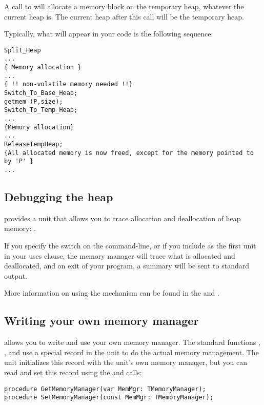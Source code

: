 A call to  will allocate a memory block on the temporary
heap, whatever the current heap is. The current heap after this call will be
the temporary heap.

Typically, what will appear in your code is the following sequence:
\begin{verbatim}
Split_Heap
...
{ Memory allocation }
...
{ !! non-volatile memory needed !!}
Switch_To_Base_Heap;
getmem (P,size);
Switch_To_Temp_Heap;
...
{Memory allocation}
...
ReleaseTempHeap;
{All allocated memory is now freed, except for the memory pointed to by 'P' }
...
\end{verbatim}
\subsection{Debugging the heap}

\fpc provides a unit that allows you to trace allocation and deallocation
of heap memory: .

If you specify the  switch on the command-line, or if you include
 as the first unit in your uses clause, the memory manager
will trace what is allocated and deallocated, and on exit of your program,
a summary will be sent to standard output.

More information on using the  mechanism can be found in the
\userref and \unitsref.

\subsection{Writing your own memory manager}

\fpc allows you to write and use your own memory manager. The standard
functions , ,  and 
use a special record in the  unit to do the actual memory management.
The  unit initializes this record with the  unit's own memory
manager, but you can read and set this record using the
 and  calls:
\begin{verbatim}
procedure GetMemoryManager(var MemMgr: TMemoryManager);
procedure SetMemoryManager(const MemMgr: TMemoryManager);
\end{verbatim}

